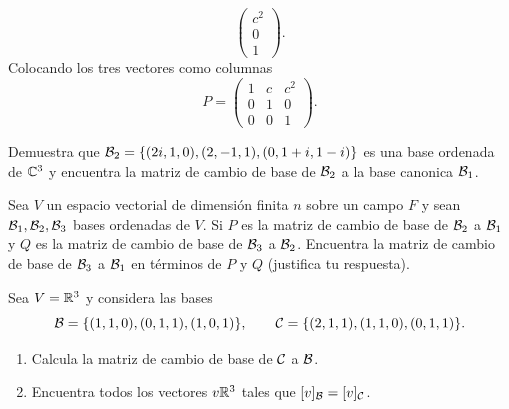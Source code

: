 \documentclass[12pt,a4paper]{article}
\begin{document}
\begin{solucion}
\begin{equation*}
\begin{pmatrix}
                c^{2}\\
                0\\
                1
            \end{pmatrix}.
        \end{equation*}
        Colocando los tres vectores como columnas
        \begin{equation*}
            P=
            \begin{pmatrix}
                1 & c & c^{2}\\
                0 & 1 & 0\\
                0 & 0 & 1
            \end{pmatrix}.
        \end{equation*}
    \end{solucion}

    \begin{mdframed}[style=mdpinkbox,frametitle={Ejercicio 4}]
        Demuestra que $\mathcal{B}_{2}=\{(2i,1,0),(2,-1,1),(0,1+i,1-i)\}$ es una base ordenada de $\mathbb{C}^{3}$ y encuentra la matriz de cambio de base
        de $\mathcal{B}_{2}$ a la base canonica $\mathcal{B}_{1}$.
    \end{mdframed}

    \begin{mdframed}[style=mdpinkbox,frametitle={Ejercicio 5}]
        Sea $V$ un espacio vectorial de dimensión finita $n$ sobre un campo $F$ y sean $\mathcal{B}_{1},\mathcal{B}_{2},\mathcal{B}_{3}$ bases ordenadas de $V$. Si $P$ es la matriz de cambio de base de $\mathcal{B}_{2}$ a
        $\mathcal{B}_{1}$ y $Q$ es la matriz de cambio de base de $\mathcal{B}_{3}$ a $\mathcal{B}_{2}$. Encuentra la matriz de cambio de base de $\mathcal{B}_{3}$ a $\mathcal{B}_{1}$ en términos de $P$ y $Q$ (justifica tu respuesta).
    \end{mdframed}

    \begin{mdframed}[style=mdpinkbox,frametitle={Ejercicio 6}]
        Sea $V=\mathbb{R}^{3}$ y considera las bases
        \begin{equation*}
            \mathcal{B}=\{(1,1,0),(0,1,1),(1,0,1)\},\qquad \mathcal{C}=\{(2,1,1),(1,1,0),(0,1,1)\}.
        \end{equation*}
        \begin{enumerate}
            \item[(a)] Calcula la matriz de cambio de base de $\mathcal{C}$ a $\mathcal{B}$.
            \item[(b)] Encuentra todos los vectores $v\mathbb{R}^{3}$ tales que $[v]_{\mathcal{B}}=[v]_{\mathcal{C}}$.
        \end{enumerate}
    \end{mdframed}
\end{document}

